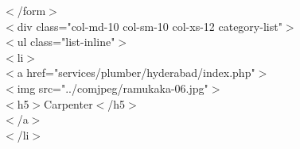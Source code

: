 \documentclass[12pt,a4paper]{report}
\begin{document}
\begin{titlepage}
{            $<$/form$>$\\
                                $<$div class="col-md-10 col-sm-10 col-xs-12 category-list"$>$\\
                                    $<$ul class="list-inline"$>$\\
                                      $<$li$>$\\
                                         $<$a href="services/plumber/hyderabad/index.php"$>$\\
                                                $<$img src="../comjpeg/ramukaka-06.jpg"$>$\\
                                                       $<$h5$>$Carpenter$<$/h5$>$\\
                                         $<$/a$>$\\
                                      $<$/li$>$\\
                                                                                                  
}
\end{titlepage}
\end{document}
